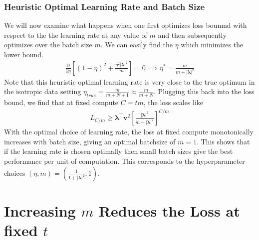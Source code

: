 \documentclass{article} %
\begin{document}
\subsubsection{Heuristic Optimal Learning Rate and Batch Size}

We will now examine what happens when one first optimizes loss bounmd with respect to the the learning rate at any value of $m$ and then subsequently optimizes over the batch size $m$. We can easily find the $\eta$ which minimizes the lower bound. 
\begin{align}
    \frac{\partial}{\partial \eta} \left[ (1-\eta)^2 + \frac{\eta^2 |\bm\lambda|^2}{m} \right] = 0 \implies \eta^* = \frac{m}{m+|\bm\lambda|^2}
\end{align}
Note that this heuristic optimal learning rate is very close to the true optimum in the isotropic data setting $\eta_{true} = \frac{m}{m+N+1} \approx \frac{m}{m+N}$. Plugging this back into the loss bound, we find that at fixed compute $C = tm$, the loss scales like
\begin{align}
   L_{C/m} \geq \bm\lambda^\top \bm v^2 \left[ \frac{|\bm\lambda|^2}{m + |\bm\lambda|^2} \right]^{C/m}
\end{align}
With the optimal choice of learning rate, the loss at fixed compute monotonically increases with batch size, giving an optimal batchsize of $m = 1$. This shows that if the learning rate is chosen optimally then small batch sizes give the best performance per unit of computation. This corresponds to the hyperparameter choices $(\eta, m) = \left( \frac{1}{1+|\bm\lambda|^2}, 1 \right)$.


\section{Increasing $m$ Reduces the Loss at fixed $t$}\label{minibatch_deriv}
\end{document}
